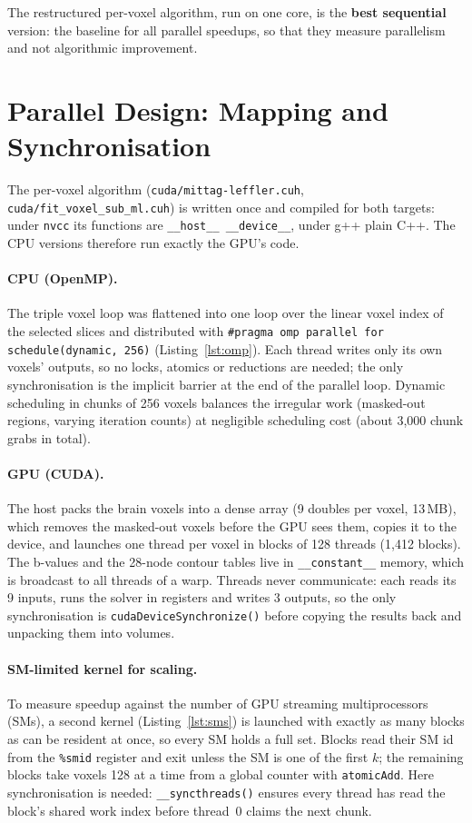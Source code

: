 \documentclass[11pt]{article}
\begin{document}
The restructured per-voxel algorithm, run on one core, is the \textbf{best sequential} version:
the baseline for all parallel speedups, so that they measure parallelism and not algorithmic
improvement.

\section{Parallel Design: Mapping and Synchronisation}

The per-voxel algorithm (\texttt{cuda/mittag-leffler.cuh}, \texttt{cuda/fit\_voxel\_sub\_ml.cuh})
is written once and compiled for both targets: under \texttt{nvcc} its functions are
\texttt{\_\_host\_\_ \_\_device\_\_}, under g++ plain C++. The CPU versions therefore run exactly the
GPU's code.

\paragraph{CPU (OpenMP).} The triple voxel loop was flattened into one loop over the linear
voxel index of the selected slices and distributed with
\texttt{\#pragma omp parallel for schedule(dynamic, 256)} (Listing~\ref{lst:omp}). Each thread
writes only its own voxels' outputs, so no locks, atomics or reductions are needed; the only
synchronisation is the implicit barrier at the end of the parallel loop. Dynamic scheduling
in chunks of 256 voxels balances the irregular work (masked-out regions, varying iteration
counts) at negligible scheduling cost (about 3,000 chunk grabs in total).

\paragraph{GPU (CUDA).} The host packs the brain voxels into a dense array (9 doubles per
voxel, 13\,MB), which removes the masked-out voxels before the GPU sees them, copies it to the
device, and launches one thread per voxel in blocks of 128 threads (1,412 blocks). The b-values
and the 28-node contour tables live in \texttt{\_\_constant\_\_} memory, which is broadcast to all
threads of a warp. Threads never communicate: each reads its 9 inputs, runs the solver in
registers and writes 3 outputs, so the only synchronisation is
\texttt{cudaDeviceSynchronize()} before copying the results back and unpacking them into
volumes.

\paragraph{SM-limited kernel for scaling.} To measure speedup against the number of GPU
streaming multiprocessors (SMs), a second kernel (Listing~\ref{lst:sms}) is launched with
exactly as many blocks as can be resident at once, so every SM holds a full set. Blocks read
their SM id from the \texttt{\%smid} register and exit unless the SM is one of the first $k$;
the remaining blocks take voxels 128 at a time from a global counter with \texttt{atomicAdd}.
Here synchronisation is needed: \texttt{\_\_syncthreads()} ensures every thread has read the
block's shared work index before thread~0 claims the next chunk.
\end{document}
